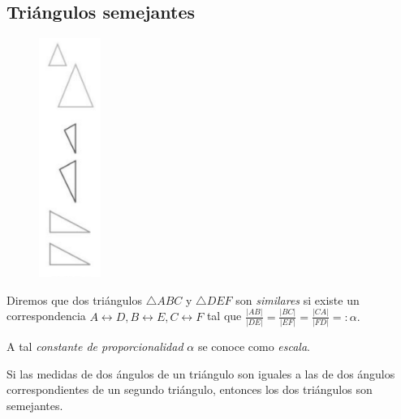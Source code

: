 \subsection{Triángulos semejantes}
{}
	\begin{figure}
		\centering
		\includegraphics[width=2cm,keepaspectratio=true]{./trig/algsup3-02.png}
		\label{fig:3-02}
	\end{figure}
	
	Diremos que dos triángulos $\triangle ABC$ y $\triangle DEF$ son \emph{similares} si 
	existe un correspondencia $A\leftrightarrow D, B\leftrightarrow E, C \leftrightarrow F$
	tal que $\frac{|AB|}{|DE|}=\frac{|BC|}{|EF|}=\frac{|CA|}{|FD|}=: \alpha.$
	
	
	A tal \emph{constante de proporcionalidad} $\alpha$ se conoce como \emph{escala}.

{}
	\begin{prop}
		Si las medidas de dos ángulos de un triángulo son iguales a las de dos ángulos correspondientes de un segundo triángulo, entonces los dos triángulos son semejantes.
	\end{prop}
	

